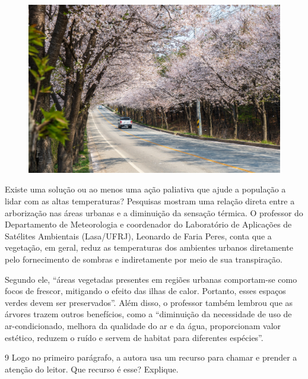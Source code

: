 \begin{myquote}

\begin{figure}
\includegraphics[width=.5\textwidth]{./imgSAEB_7_POR/media/image47.png}
\end{figure}

Existe uma solução ou ao menos uma ação paliativa que ajude a população a
lidar com as altas temperaturas? Pesquisas mostram uma relação direta entre a
arborização nas áreas urbanas e a diminuição da sensação térmica. O professor
do Departamento de Meteorologia e coordenador do Laboratório de Aplicações de
Satélites Ambientais (Lasa/UFRJ), Leonardo de Faria Peres, conta que a
vegetação, em geral, reduz as temperaturas dos ambientes urbanos diretamente
pelo fornecimento de sombras e indiretamente por meio de sua transpiração.

Segundo ele, ``áreas vegetadas presentes em regiões urbanas comportam-se como
focos de frescor, mitigando o efeito das ilhas de calor. Portanto, esses
espaços verdes devem ser preservados''. Além disso, o professor também lembrou
que as árvores trazem outros benefícios, como a ``diminuição da necessidade de
uso de ar-condicionado, melhora da qualidade do ar e da água, proporcionam
valor estético, reduzem o ruído e servem de habitat para diferentes espécies''.


\end{myquote}

\num{9} Logo no primeiro parágrafo, a autora usa um recurso para chamar e prender
a atenção do leitor. Que recurso é esse? Explique. 


